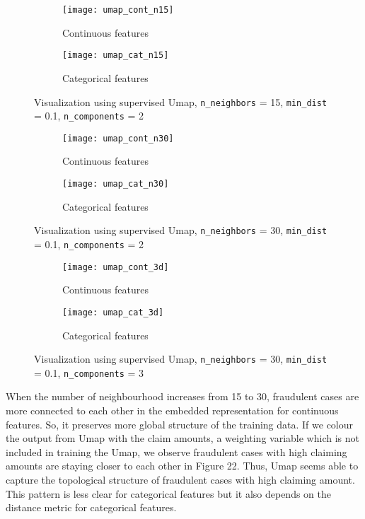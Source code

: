 \documentclass[12pt]{article}
\begin{document}
\begin{figure}[h]
\centering
\begin{subfigure}{.5\textwidth}
  \centering
  \texttt{[image: umap\_cont\_n15]}
  \caption{Continuous features}
  \label{fig:sub1}
\end{subfigure}%
\begin{subfigure}{.5\textwidth}
  \centering
  \texttt{[image: umap\_cat\_n15]}
  \caption{Categorical features}
  \label{fig:sub2}
\end{subfigure}
\caption{Visualization using supervised Umap, \texttt{n\_neighbors} = 15, \texttt{min\_dist} = 0.1, \texttt{n\_components} = 2}

\begin{subfigure}{.5\textwidth}
  \centering
  \texttt{[image: umap\_cont\_n30]}
  \caption{Continuous features}
  \label{fig:sub3}
\end{subfigure}%
\begin{subfigure}{.5\textwidth}
  \centering
  \texttt{[image: umap\_cat\_n30]}
  \caption{Categorical features}
  \label{fig:sub4}
\end{subfigure}
\caption{Visualization using supervised Umap, \texttt{n\_neighbors} = 30, \texttt{min\_dist} = 0.1, \texttt{n\_components} = 2}

\begin{subfigure}{.5\textwidth}
  \centering
  \texttt{[image: umap\_cont\_3d]}
  \caption{Continuous features}
  \label{fig:sub3}
\end{subfigure}%
\begin{subfigure}{.5\textwidth}
  \centering
  \texttt{[image: umap\_cat\_3d]}
  \caption{Categorical features}
  \label{fig:sub4}
\end{subfigure}
\caption{Visualization using supervised Umap, \texttt{n\_neighbors} = 30, \texttt{min\_dist} = 0.1, \texttt{n\_components} = 3}
\end{figure}

\clearpage
When the number of neighbourhood increases from 15 to 30, fraudulent cases are more connected to each other in the embedded representation for continuous features. So, it preserves more global structure of the training data. If we colour the output from Umap with the claim amounts, a weighting variable which is not included in training the Umap, we observe fraudulent cases with high claiming amounts are staying closer to each other in Figure 22. Thus, Umap seems able to capture the topological structure of fraudulent cases with high claiming amount. This pattern is less clear for categorical features but it also depends on the distance metric for categorical features.\\
\end{document}

